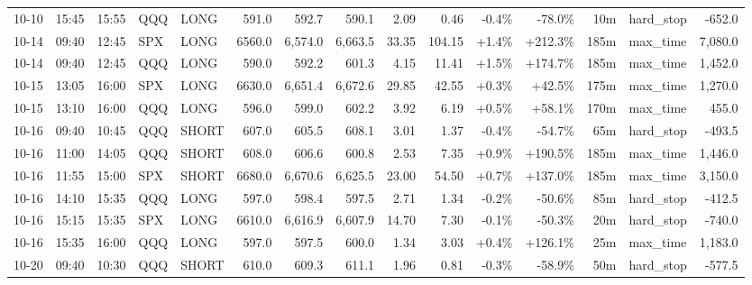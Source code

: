 \documentclass[11pt,a4paper,twoside]{article}
\begin{document}
\begin{landscape}
\begin{center}
\begin{longtable}{>{\color{txtmain}}l l l l l r r r r r r r r >{\color{txtmain}}l r}
10-10 & 15:45 & 15:55 & QQQ & LONG & 591.0 & 592.7 & 590.1 & 2.09 & 0.46 & \textcolor{lossred}{-0.4\%} & \textcolor{lossred}{-78.0\%} & 10m & hard\_stop & \textcolor{lossred}{-652.0} \\
10-14 & 09:40 & 12:45 & SPX & LONG & 6560.0 & 6,574.0 & 6,663.5 & 33.35 & 104.15 & \textcolor{wingreen}{+1.4\%} & \textcolor{wingreen}{+212.3\%} & 185m & max\_time & \textcolor{wingreen}{7,080.0} \\
10-14 & 09:40 & 12:45 & QQQ & LONG & 590.0 & 592.2 & 601.3 & 4.15 & 11.41 & \textcolor{wingreen}{+1.5\%} & \textcolor{wingreen}{+174.7\%} & 185m & max\_time & \textcolor{wingreen}{1,452.0} \\
10-15 & 13:05 & 16:00 & SPX & LONG & 6630.0 & 6,651.4 & 6,672.6 & 29.85 & 42.55 & \textcolor{wingreen}{+0.3\%} & \textcolor{wingreen}{+42.5\%} & 175m & max\_time & \textcolor{wingreen}{1,270.0} \\
10-15 & 13:10 & 16:00 & QQQ & LONG & 596.0 & 599.0 & 602.2 & 3.92 & 6.19 & \textcolor{wingreen}{+0.5\%} & \textcolor{wingreen}{+58.1\%} & 170m & max\_time & \textcolor{wingreen}{455.0} \\
10-16 & 09:40 & 10:45 & QQQ & SHORT & 607.0 & 605.5 & 608.1 & 3.01 & 1.37 & \textcolor{lossred}{-0.4\%} & \textcolor{lossred}{-54.7\%} & 65m & hard\_stop & \textcolor{lossred}{-493.5} \\
10-16 & 11:00 & 14:05 & QQQ & SHORT & 608.0 & 606.6 & 600.8 & 2.53 & 7.35 & \textcolor{wingreen}{+0.9\%} & \textcolor{wingreen}{+190.5\%} & 185m & max\_time & \textcolor{wingreen}{1,446.0} \\
10-16 & 11:55 & 15:00 & SPX & SHORT & 6680.0 & 6,670.6 & 6,625.5 & 23.00 & 54.50 & \textcolor{wingreen}{+0.7\%} & \textcolor{wingreen}{+137.0\%} & 185m & max\_time & \textcolor{wingreen}{3,150.0} \\
10-16 & 14:10 & 15:35 & QQQ & LONG & 597.0 & 598.4 & 597.5 & 2.71 & 1.34 & \textcolor{lossred}{-0.2\%} & \textcolor{lossred}{-50.6\%} & 85m & hard\_stop & \textcolor{lossred}{-412.5} \\
10-16 & 15:15 & 15:35 & SPX & LONG & 6610.0 & 6,616.9 & 6,607.9 & 14.70 & 7.30 & \textcolor{lossred}{-0.1\%} & \textcolor{lossred}{-50.3\%} & 20m & hard\_stop & \textcolor{lossred}{-740.0} \\
10-16 & 15:35 & 16:00 & QQQ & LONG & 597.0 & 597.5 & 600.0 & 1.34 & 3.03 & \textcolor{wingreen}{+0.4\%} & \textcolor{wingreen}{+126.1\%} & 25m & max\_time & \textcolor{wingreen}{1,183.0} \\
10-20 & 09:40 & 10:30 & QQQ & SHORT & 610.0 & 609.3 & 611.1 & 1.96 & 0.81 & \textcolor{lossred}{-0.3\%} & \textcolor{lossred}{-58.9\%} & 50m & hard\_stop & \textcolor{lossred}{-577.5} \\

\end{longtable}
\end{center}
\end{landscape}
\end{document}
